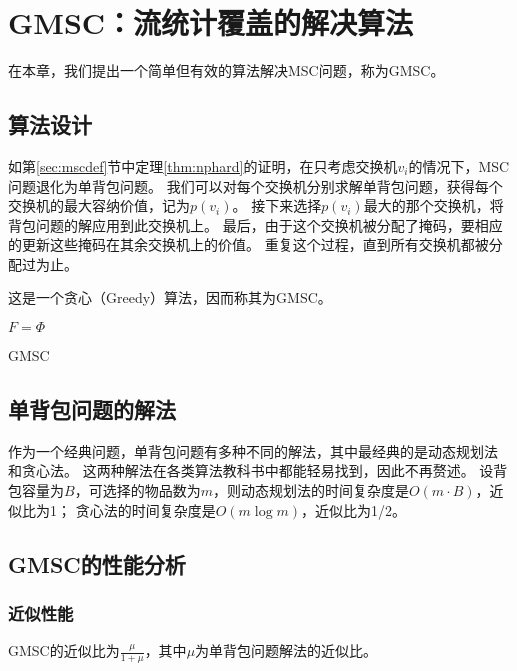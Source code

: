 \chapter{GMSC：流统计覆盖的解决算法}\label{chap:gmsc}
在本章，我们提出一个简单但有效的算法解决MSC问题，称为GMSC。

\section{算法设计}\label{sec:gmsc}
如第\ref{sec:mscdef}节中定理\ref{thm:nphard}的证明，在只考虑交换机$v_i$的情况下，MSC问题退化为单背包问题。
我们可以对每个交换机分别求解单背包问题，获得每个交换机的最大容纳价值，记为$p(v_i)$。
接下来选择$p(v_i)$最大的那个交换机，将背包问题的解应用到此交换机上。
最后，由于这个交换机被分配了掩码，要相应的更新这些掩码在其余交换机上的价值。
重复这个过程，直到所有交换机都被分配过为止。

这是一个贪心（Greedy）算法，因而称其为GMSC。
\begin{algorithm}[htb]
    \small
    \SetAlgoLined
    $F=\Phi$\;
    \caption{GMSC}
    \label{alg:count_max}
\end{algorithm}

\section{单背包问题的解法}
作为一个经典问题，单背包问题有多种不同的解法，其中最经典的是动态规划法 \cite{martello1999dynamic}和贪心法\cite{cmulec10}。
这两种解法在各类算法教科书中都能轻易找到，因此不再赘述。
设背包容量为$B$，可选择的物品数为$m$，则动态规划法的时间复杂度是$O(m\cdot B)$，近似比为1；
贪心法的时间复杂度是$O(m \log{m})$，近似比为1/2。

\section{GMSC的性能分析}
\subsection{近似性能}
\begin{theorem}\label{tm:gmscappr}
    GMSC的近似比为$\frac{\mu}{1+\mu}$，其中$\mu$为单背包问题解法的近似比。
\end{theorem}

